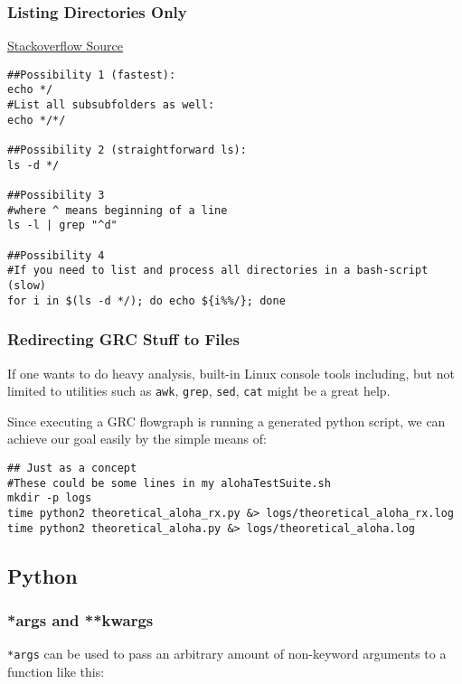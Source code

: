 \documentclass{article}
\begin{document}
\subsubsection{Listing Directories Only}

\href{https://stackoverflow.com/questions/14352290/listing-only-directories-using-ls-in-bash-an-examination}{Stackoverflow Source}

\begin{verbatim}
##Possibility 1 (fastest):
echo */
#List all subsubfolders as well:
echo */*/

##Possibility 2 (straightforward ls):
ls -d */

##Possibility 3
#where ^ means beginning of a line
ls -l | grep "^d"

##Possibility 4
#If you need to list and process all directories in a bash-script (slow)
for i in $(ls -d */); do echo ${i%%/}; done
\end{verbatim}

\subsubsection{Redirecting GRC Stuff to Files}
If one wants to do heavy analysis, built-in Linux console tools including, but not limited to utilities such as \verb|awk|, \verb|grep|, \verb|sed|, \verb|cat| might be a great help.

Since executing a GRC flowgraph is running a generated python script, we can achieve our goal easily by the simple means of:

\begin{verbatim}
## Just as a concept
#These could be some lines in my alohaTestSuite.sh
mkdir -p logs
time python2 theoretical_aloha_rx.py &> logs/theoretical_aloha_rx.log
time python2 theoretical_aloha.py &> logs/theoretical_aloha.log
\end{verbatim}

\subsection{Python}

\subsubsection{*args and **kwargs}

\texttt{*args} can be used to pass an arbitrary amount of non-keyword arguments to a function like this:
\end{document}
